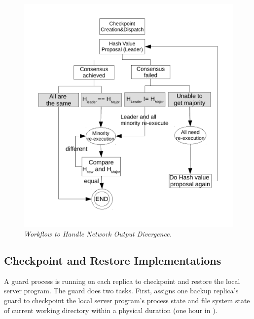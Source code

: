 % 



\begin{figure}[t]
\centering
\vspace{-.10in}
\includegraphics[width=.5\textwidth]{figures/output-divergence}
\vspace{-.50in}
\caption{{\em Workflow to Handle Network Output Divergence.}} 
\label{fig:divergence}
\vspace{-.20in}
\end{figure}

\subsection{Checkpoint and Restore Implementations} \label{sec:checkpoint}

A guard process is running on each replica to checkpoint and restore the local 
server program. The guard does two tasks. First, \xxx assigns one backup 
replica's guard to checkpoint the local server program's process state and file 
system state of current working directory within a physical duration 
\tcheckpoint (one hour in \xxx).

